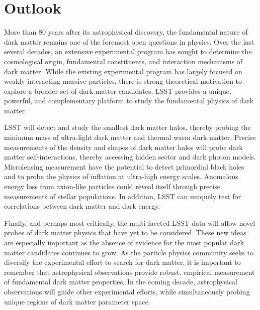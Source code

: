 \section{Outlook}
\label{sec:outlook}

More than 80 years after its astrophysical discovery, the fundamental nature of dark matter remains one of the foremost open questions in physics.
Over the last several decades, an extensive experimental program has sought to determine the cosmological origin, fundamental constituents, and interaction mechanisms of dark matter. 
While the existing experimental program has largely focused on weakly-interacting massive particles, there is strong theoretical motivation to explore a broader set of dark matter candidates.
LSST provides a unique, powerful, and complementary platform to study the fundamental physics of dark matter.

LSST will detect and study the smallest dark matter halos, thereby probing the minimum mass of ultra-light dark matter and thermal warm dark matter.
Precise measurements of the density and shapes of dark matter halos will probe dark matter self-interactions, thereby accessing hidden sector and dark photon models.
Microlensing measurement have the potential to detect primordial black holes and to probe the physics of inflation at ultra-high energy scales.
Anomalous energy loss from axion-like particles could reveal itself through precise measurements of stellar populations.
In addition, LSST can uniquely test for correlations between dark matter and dark energy.

Finally, and perhaps most critically, the multi-faceted LSST data will allow novel probes of dark matter physics that have yet to be considered.
These new ideas are especially important as the absence of evidence for the most popular dark matter candidates continues to grow.
As the particle physics community seeks to diversify the experimental effort to search for dark matter, it is important to remember that astrophysical observations provide robust, empirical measurement of fundamental dark matter properties.
In the coming decade, astrophysical observations will guide other experimental efforts, while simultaneously probing unique regions of dark matter parameter space.

